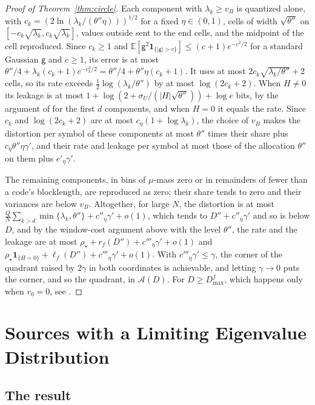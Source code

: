\documentclass[11pt,onecolumn]{IEEEtran}
\newcommand{\E}{\mathbb{E}}
\begin{document}
\begin{proof}[Proof of Theorem~\ref{thm:circle}]
Each component with $\lambda_k\ge v_B$ is quantized alone, with
$c_k=(2\ln(\lambda_k/(\theta''\eta)))^{1/2}$ for a fixed $\eta\in(0,1)$, cells
of width $\sqrt{\theta''}$ on $[-c_k\sqrt{\lambda_k},c_k\sqrt{\lambda_k}]$,
values outside sent to the end cells, and the midpoint of the cell
reproduced. Since $c_k\ge1$ and
$\E[\mathsf g^2\mathbf 1_{\{|\mathsf g|>c\}}]\le(c+1)e^{-c^2/2}$ for a standard
Gaussian $\mathsf g$ and $c\ge1$, its error is at most
$\theta''/4+\lambda_k(c_k+1)e^{-c_k^2/2}=\theta''/4+\theta''\eta(c_k+1)$. It
uses at most $2c_k\sqrt{\lambda_k/\theta''}+2$ cells, so its rate exceeds
$\tfrac12\log(\lambda_k/\theta'')$ by at most $\log(2c_k+2)$. When $H\ne0$ its
leakage is at most $1+\log(2+\sigma_U/(|H|\sqrt{\theta''}))+\log e$ bits, by
the argument of \cite[proof of Theorem~26]{part3} for the first $d$
components, and when $H=0$ it equals the rate. Since $c_k$ and
$\log(2c_k+2)$ are at most $c_\eta(1+\log\lambda_k)$, the choice of $v_B$
makes the distortion per symbol of these components at most $\theta''$
times their share plus $c_\eta\theta''\eta\gamma'$, and their rate and
leakage per symbol at most those of the allocation $\theta''$ on them
plus $c'_\eta\gamma'$.

The remaining components, in bins of $\mu$-mass zero or in remainders of
fewer than a code's blocklength, are reproduced as zero; their share
tends to zero and their variances are below $v_B$. Altogether, for large
$N$, the distortion is at most
$\tfrac QN\sum_{k>d}\min\{\lambda_k,\theta''\}+c''_\eta\gamma'+o(1)$, which
tends to $D''+c''_\eta\gamma'$ and so is below $D$, and by the window-cost
argument above with the level $\theta''$, the rate and the leakage are
at most $\rho_\star+r_f(D'')+c'''_\eta\gamma'+o(1)$ and
$\rho_\star\mathbf 1_{\{H=0\}}+\ell_f(D'')+c'''_\eta\gamma'+o(1)$. With
$c'''_\eta\gamma'\le\gamma$, the corner of the quadrant raised by $2\gamma$
in both coordinates is achievable, and letting $\gamma\to0$ puts the
corner, and so the quadrant, in $\mathcal A(D)$. For $D\ge D_{\max}^f$,
which happens only when $r_0=0$, see \cite[Theorem~26]{part3}.
\end{proof}

\section{Sources with a Limiting Eigenvalue Distribution}
\label{sec:law}

\subsection{The result}
\end{document}
